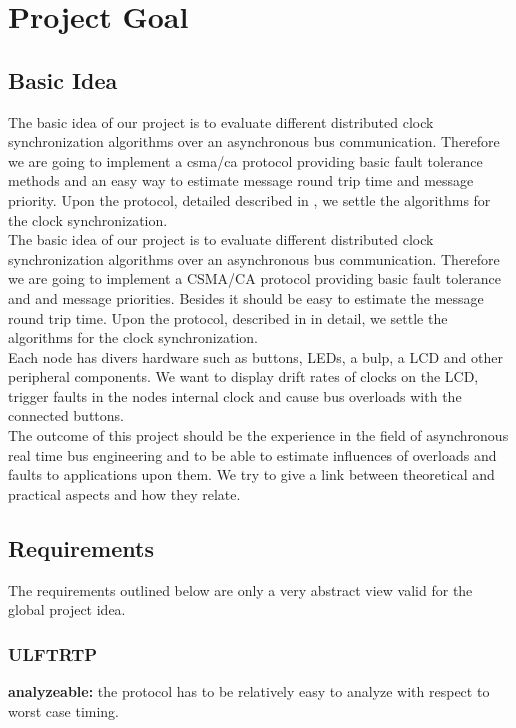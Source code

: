 \section{Project Goal}

\subsection{Basic Idea}
The basic idea of our project is to evaluate different distributed clock synchronization algorithms over an asynchronous bus communication. Therefore we are going to implement a csma/ca protocol providing basic fault tolerance methods and an easy way to estimate message round trip time and message priority.
Upon the protocol, detailed described in \cite[NESD2]{NESD2}, we settle the algorithms for the clock synchronization.\\

The basic idea of our project is to evaluate different distributed clock synchronization algorithms over an 
asynchronous bus communication. Therefore we are going to implement a CSMA/CA protocol providing basic fault 
tolerance and and message priorities. Besides it should be easy to estimate the message round trip time.
Upon the protocol, described in \cite[NESD2]{NESD2} in detail, we settle the algorithms for the clock synchronization.\\

Each node has divers hardware such as buttons, LEDs, a bulp, a LCD and other peripheral components. 
We want to display drift rates of clocks on the LCD, trigger faults in the nodes internal clock and  
cause bus overloads with the connected buttons.\\

The outcome of this project should be the experience in the field of asynchronous real time bus engineering and 
to be able to estimate influences of overloads and faults to applications upon them.
We try to give a link between theoretical and practical aspects and how they relate.


\subsection{Requirements}
The requirements outlined below are only a very abstract view valid for the global project idea.

\subsubsection{ULFTRTP}
\begin{req}
\label{req:ulftrtp:analyzeable}
\textbf{analyzeable: }the protocol has to be relatively easy to analyze with respect to worst case timing.
\end{req}

